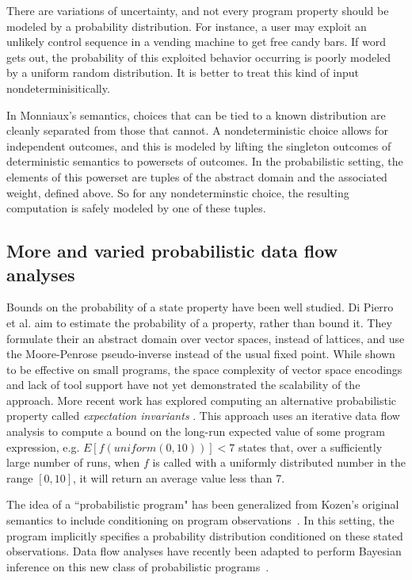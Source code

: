 There are variations of uncertainty,
and not every program property should be modeled by a
probability distribution.
For instance, a user may exploit an unlikely control sequence
in a vending machine to get free candy bars. 
If word gets out, the probability of
this exploited behavior occurring is poorly modeled by a uniform 
random distribution.
It is better to treat this kind of input nondeterminisitically.

In Monniaux's semantics, choices that can be tied to a known
distribution are cleanly separated from those that cannot.
A nondeterministic choice allows for independent outcomes, and
this is modeled by lifting the singleton outcomes of deterministic
semantics to powersets of outcomes.
In the probabilistic setting, the elements of this powerset are
tuples of the abstract domain and the associated weight, defined
above.
So for any nondeterminstic choice, the resulting computation 
is safely modeled by one of these tuples.

\subsection{More and varied probabilistic data flow analyses}

Bounds on the probability of a state property have been well studied.
Di Pierro et al. \cite{di2013probabilistic} aim to estimate the probability of a property,
rather than bound it.  They formulate their an abstract 
domain over vector spaces, instead of lattices, and use
the Moore-Penrose pseudo-inverse instead of the usual fixed point.
While shown to be effective on small programs, the space
complexity of vector space encodings and lack of tool support
have not yet demonstrated the scalability of the approach.
More recent work has explored computing an alternative probabilistic
property called {\sl expectation invariants} \cite{chakarov2014expectation}.
This approach uses an iterative data flow analysis to 
compute a bound on the long-run expected value of
some program expression, e.g. $E[f(uniform(0,10))] < 7$ states that,
over a sufficiently large number of runs, when $f$ is called with
a uniformly distributed number in the range $[0,10]$, it will return
an average value less than 7.

The idea of a ``probabilistic program" has been generalized from
Kozen's original semantics to include conditioning on program
observations~\cite{Gordon2014}.
In this setting, the program implicitly specifies a probability 
distribution conditioned on these stated observations.
Data flow analyses have recently been adapted to perform Bayesian
inference on this new class of probabilistic 
programs~\cite{claret2013bayesian}.  

